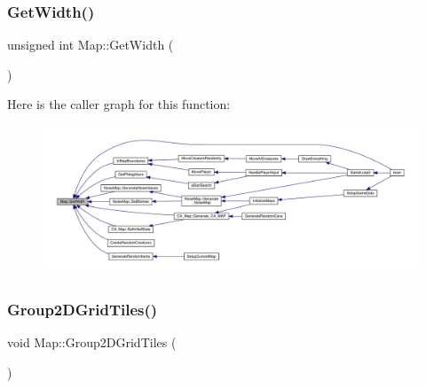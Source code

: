 \subsubsection{\texorpdfstring{Get\+Width()}{GetWidth()}}
{\footnotesize\ttfamily unsigned int Map\+::\+Get\+Width (\begin{DoxyParamCaption}{ }\end{DoxyParamCaption})}

Here is the caller graph for this function\+:
\nopagebreak
\begin{figure}[H]
\begin{center}
\leavevmode
\includegraphics[width=350pt]{class_map_a1e9263abe2e1290fc383586c327f9f4a_icgraph}
\end{center}
\end{figure}
\mbox{\label{class_map_af2b4481fa4588c8aa5ab6e8c45c5f7cf}} 
\subsubsection{\texorpdfstring{Group2\+D\+Grid\+Tiles()}{Group2DGridTiles()}}
{\footnotesize\ttfamily void Map\+::\+Group2\+D\+Grid\+Tiles (\begin{DoxyParamCaption}{ }\end{DoxyParamCaption})}

